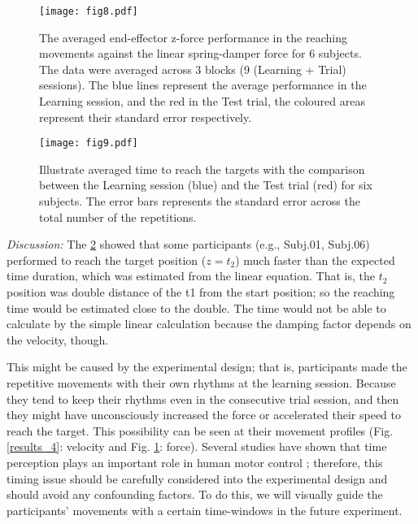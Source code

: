 \begin{figure}
	\centering
	\texttt{[image: fig8.pdf]}
	\caption{The averaged end-effector z-force performance in the reaching movements against the linear spring-damper force for 6 subjects. The data were averaged across 3 blocks (9 (Learning + Trial) sessions). The blue lines represent the average performance in the Learning session, and the red in the Test trial, the coloured areas represent their standard error respectively.}
	\label{results_5}
\end{figure}

\begin{figure}
	\centering
	\texttt{[image: fig9.pdf]}
	\caption{Illustrate averaged time to reach the targets with the comparison between the Learning session (blue) and the Test trial (red) for six	subjects. The error bars represents the standard error across the total number of the repetitions.}
	\label{results_6}
\end{figure}



\textit{Discussion:} The \ref{results_6} showed that some participants (e.g., Subj.01, Subj.06) performed to reach the target position ($z = t_2$) much faster than the expected time duration, which was estimated from the linear equation. That is, the $t_2$ position was double distance of the t1 from the start position; so the reaching time would be estimated close to the double. The time would not be able to calculate by the simple linear calculation because the damping factor depends on the velocity, though.

This might be caused by the experimental design; that is, participants made the repetitive movements with their own rhythms at the learning session. Because they tend to keep their rhythms even in the consecutive trial session, and then they might have unconsciously increased the force or accelerated their speed to reach the target. This possibility can be seen at their movement profiles (Fig. \ref{results_4}: velocity and Fig. \ref{results_5}: force). Several studies have shown that time perception plays an important role in human motor control \cite{Berret&Jean16, Rank&DiLuca15}; therefore, this timing issue should be carefully considered into the experimental design and should avoid any confounding factors. To do this, we will visually guide the participants' movements with a certain time-windows in the future experiment.

